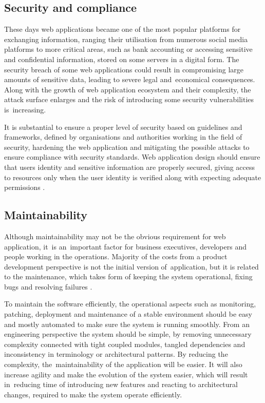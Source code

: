 \subsection{Security and compliance}

These days web applications became one of the most popular platforms for exchanging information, ranging their utilisation from numerous social media platforms to more critical areas, such as bank accounting or accessing sensitive and confidential information, stored on some servers in a digital form. The security breach of some web applications could result in compromising large amounts of sensitive data, leading to severe legal and~economical consequences. Along with the growth of web application ecosystem and their complexity, the attack surface enlarges and the risk of introducing some security vulnerabilities is~increasing.

It is substantial to ensure a proper level of security based on guidelines and frameworks, defined by organisations and authorities working in the field of security, hardening the web application and mitigating the possible attacks to ensure compliance with security standards. Web application design should ensure that users identity and sensitive information are properly secured, giving access to resources only when the user identity is verified along with expecting adequate permissions \cite{ASurveyonWebApplicationSecurity}.

\subsection{Maintainability}

Although maintainability may not be the obvious requirement for web application, it~is an~important factor for business executives, developers and people working in the operations. Majority of the costs from a product development perspective is not the initial version of~application, but it is related to the maintenance, which takes form of keeping the system operational, fixing bugs and resolving failures \cite{DesignDataIntensiveApplications}.

To maintain the software efficiently, the operational aspects such as monitoring, patching, deployment and maintenance of a stable environment should be easy and mostly automated to make sure the system is running smoothly. From an engineering perspective the system should be simple, by removing unnecessary complexity connected with tight coupled modules, tangled dependencies and inconsistency in terminology or architectural patterns. By reducing the complexity, the~maintainability of the application will be easier. It will also increase agility and make the evolution of the system easier, which will result in~reducing time of introducing new features and reacting to architectural changes, required to make the system operate efficiently.

